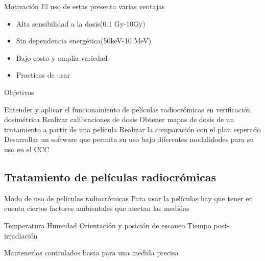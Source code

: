 \documentclass[12pt]{beamer}
\begin{document}
\begin{frame}{Motivación}
	El uso de estas presenta varias ventajas
	\begin{itemize}
		\item Alta sensibilidad a la dosis(0.1 Gy-10Gy)
		\item Sin dependencia energética(50keV-10 MeV)
		\item Bajo costo y amplia variedad
		\item Practicas de usar
	\end{itemize}
\end{frame}

\begin{frame}{Objetivos}
	\begin{outline}
		\1 Entender y aplicar el funcionamiento de películas radiocrómicas en verificación dosimétrica
		\2 Realizar calibraciones de dosis
		\2 Obtener mapas de dosis de un tratamiento a partir de una película
		\2 Realizar la comparación con el plan esperado
		\1 Desarrollar un software que permita su uso bajo diferentes modalidades para su uso en el CCC
	\end{outline}
\end{frame}


\subsection{Tratamiento de películas radiocrómicas}
\begin{frame}{Modo de uso de películas radiocrómicas}
Para usar la películas hay que tener en cuenta ciertos factores ambientales que afectan las medidas
	\begin{outline}
		\1 Temperatura
		\1 Humedad
		\1 Orientación y posición de escaneo
		\1 Tiempo post-irradiación
	\end{outline}
Mantenerlos controlados basta para una medida precisa
\end{frame}
\end{document}
